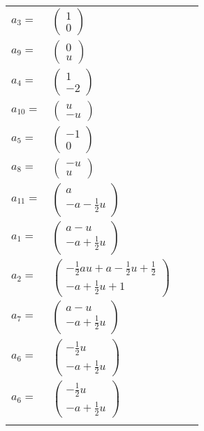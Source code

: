 \documentclass[1p]{elsarticle_modified}
\theoremstyle{definition}
\begin{document}
\begin{tabular}{m{7pt} m{180pt} m{7pt} m{180pt} }
\flushright $a_{3}=$&$\begin{pmatrix}1\\0\end{pmatrix}$ \\
\flushright $a_{9}=$&$\begin{pmatrix}0\\u\end{pmatrix}$ \\
\flushright $a_{4}=$&$\begin{pmatrix}1\\-2\end{pmatrix}$ \\
\flushright $a_{10}=$&$\begin{pmatrix}u\\- u\end{pmatrix}$ \\
\flushright $a_{5}=$&$\begin{pmatrix}-1\\0\end{pmatrix}$ \\
\flushright $a_{8}=$&$\begin{pmatrix}- u\\u\end{pmatrix}$ \\
\flushright $a_{11}=$&$\begin{pmatrix}a\\- a-\frac{1}{2} u\end{pmatrix}$ \\
\flushright $a_{1}=$&$\begin{pmatrix}a- u\\- a+\frac{1}{2} u\end{pmatrix}$ \\
\flushright $a_{2}=$&$\begin{pmatrix}-\frac{1}{2} a u+a-\frac{1}{2} u+\frac{1}{2}\\- a+\frac{1}{2} u+1\end{pmatrix}$ \\
\flushright $a_{7}=$&$\begin{pmatrix}a- u\\- a+\frac{1}{2} u\end{pmatrix}$ \\
\flushright $a_{6}=$&$\begin{pmatrix}-\frac{1}{2} u\\- a+\frac{1}{2} u\end{pmatrix}$\\ \flushright $a_{6}=$&$\begin{pmatrix}-\frac{1}{2} u\\- a+\frac{1}{2} u\end{pmatrix}$\\&\end{tabular}
\end{document}
